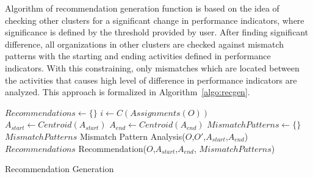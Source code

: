 Algorithm of recommendation generation function is based on the idea of checking other clusters for a significant change in performance indicators, where significance is defined by the threshold provided by user. After finding significant difference, all organizations in other clusters are checked against mismatch patterns with the starting and ending activities defined in performance indicators. With this constraining, only mismatches which are located between the activities that causes high level of difference in performance indicators are analyzed. This approach is formalized in Algorithm~\ref{algo:recgen}.
 \begin{algorithm}
\DontPrintSemicolon %
$Recommendations \leftarrow \{\}$ \;
$i \leftarrow C(Assignments(O))$ \;
 { 
	 { 
		 {
			 {
				$A_{start} \leftarrow Centroid(A_{start})$ \;
				$A_{end} \leftarrow Centroid(A_{end})$ \;
				$MismatchPatterns \leftarrow \{\}$ \;
		 		 {
					$MismatchPatterns$ \leftarrow  Mismatch Pattern Analysis($O$,$O'$,$A_{start}$,$A_{end}$) \;
				}
				$Recommendations$ \leftarrow  Recommendation($O$,$A_{start}$,$A_{end}$, $MismatchPatterns$) \;
			}
		}
	}
}
 \;
\caption{Recommendation Generation}
\label{algo:recgen}
\end{algorithm}

